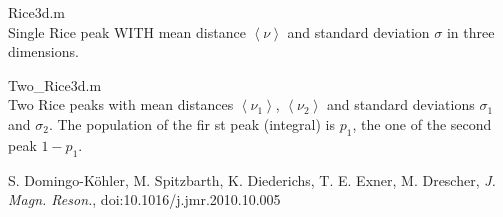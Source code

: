 	\item {\ttfamily Rice3d.m} \\ Single Rice peak \cite{koehler2010} WITH mean distance $\left\langle \nu\right\rangle$ and standard deviation $\sigma$ in three dimensions.
	\item {\ttfamily Two\_Rice3d.m} \\ Two Rice peaks \cite{koehler2010} with mean distances $\left\langle\nu_1\right\rangle$, $\left\langle\nu_2\right\rangle$ and standard deviations $\sigma_1$ and $\sigma_2$. The population of the fir
st peak (integral) is $p_1$, the one of the second peak $1-p_1$.

S. Domingo-K\"ohler, M. Spitzbarth, K. Diederichs, T. E. Exner, M. Drescher,
{\em J. Magn. Reson.}, doi:10.1016/j.jmr.2010.10.005